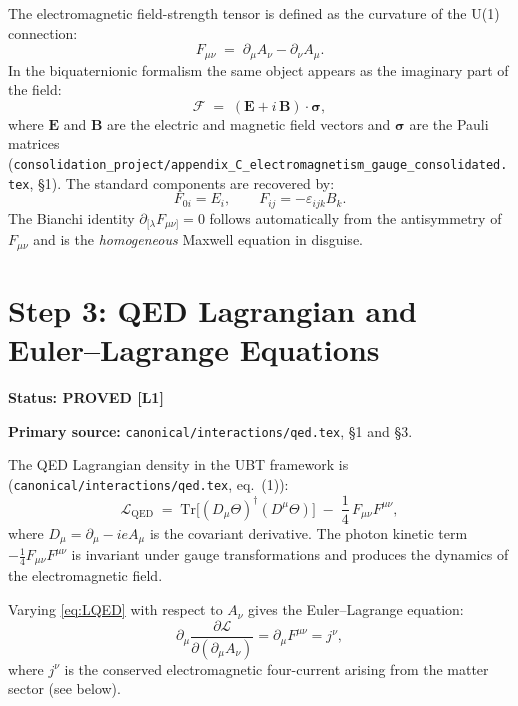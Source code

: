 \documentclass[11pt,a4paper]{article}
\newcommand{\Lone}{\textbf{[L1]}}
\newcommand{\PROVED}{\textbf{PROVED}}
\begin{document}
The electromagnetic field-strength tensor is defined as the curvature of the
U(1) connection:
\begin{equation}\label{eq:Fmunu}
  F_{\mu\nu} \;=\; \partial_\mu A_\nu - \partial_\nu A_\mu.
\end{equation}
In the biquaternionic formalism the same object appears as the imaginary part
of the field:
\begin{equation}
  \mathcal{F} \;=\; (\mathbf{E} + i\,\mathbf{B})\cdot\boldsymbol{\sigma},
\end{equation}
where $\mathbf{E}$ and $\mathbf{B}$ are the electric and magnetic field vectors
and $\boldsymbol{\sigma}$ are the Pauli matrices
(\texttt{consolidation\_project/appendix\_C\_electromagnetism\_gauge\_consolidated.tex}, \S1).
The standard components are recovered by:
\begin{equation}
  F_{0i} = E_i, \qquad F_{ij} = -\varepsilon_{ijk}B_k.
\end{equation}
The Bianchi identity $\partial_{[\lambda}F_{\mu\nu]} = 0$ follows automatically
from the antisymmetry of $F_{\mu\nu}$ and is the \emph{homogeneous} Maxwell
equation in disguise.

\section{Step 3: QED Lagrangian and Euler--Lagrange Equations}

\noindent\textbf{Status: \PROVED{} \Lone}

\noindent\textbf{Primary source:}
\texttt{canonical/interactions/qed.tex}, \S1 and \S3.

\medskip

The QED Lagrangian density in the UBT framework is
(\texttt{canonical/interactions/qed.tex}, eq.\ (1)):
\begin{equation}\label{eq:LQED}
  \mathcal{L}_{\mathrm{QED}}
  \;=\;
  \mathrm{Tr}\bigl[(D_\mu\Theta)^\dagger (D^\mu\Theta)\bigr]
  \;-\;
  \frac{1}{4}\,F_{\mu\nu}F^{\mu\nu},
\end{equation}
where $D_\mu = \partial_\mu - ieA_\mu$ is the covariant derivative.
The photon kinetic term $-\tfrac{1}{4}F_{\mu\nu}F^{\mu\nu}$ is invariant under
gauge transformations and produces the dynamics of the electromagnetic field.

Varying \eqref{eq:LQED} with respect to $A_\nu$ gives the Euler--Lagrange equation:
\begin{equation}\label{eq:ELeq}
  \partial_\mu\frac{\partial\mathcal{L}}{\partial(\partial_\mu A_\nu)}
  = \partial_\mu F^{\mu\nu} = j^\nu,
\end{equation}
where $j^\nu$ is the conserved electromagnetic four-current arising from
the matter sector (see below).
\end{document}
